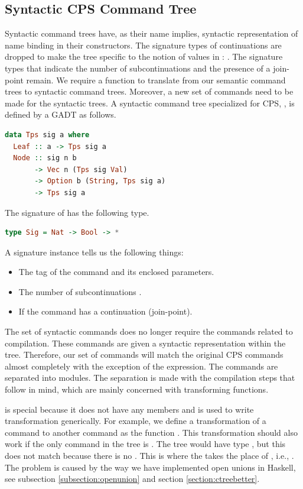 \subsection{\label{subsection:syntree}Syntactic CPS Command Tree}
Syntactic command trees have, as their name implies, syntactic representation of name binding in their constructors. The signature types of continuations are dropped to make the tree specific to the notion of values in : . The signature types that indicate the number of subcontinuations and the presence of a join-point remain. We require a function to translate from our semantic command trees to syntactic command trees. Moreover, a new set of commands need to be made for the syntactic trees. A syntactic command tree specialized for CPS, , is defined by a GADT as follows.

\begin{lstlisting}[language=Haskell]
data Tps sig a where
  Leaf :: a -> Tps sig a
  Node :: sig n b
       -> Vec n (Tps sig Val)
       -> Option b (String, Tps sig a)
       -> Tps sig a
\end{lstlisting}

The signature of  has the following type.

\begin{lstlisting}[language=Haskell]
type Sig = Nat -> Bool -> *
\end{lstlisting}

A signature instance  tells us the following things:

\begin{itemize}
\item The tag of the command and its enclosed parameters.
\item The number of subcontinuations .
\item If the command has a continuation (join-point).
\end{itemize}

The set of syntactic commands does no longer require the commands related to compilation. These commands are given a syntactic representation within the tree. Therefore, our set of commands will match the original CPS commands almost completely with the exception of the  expression. The commands are separated into modules. The separation is made with the compilation steps that follow in mind, which are mainly concerned with transforming functions. 

 is special because it does not have any members and is used to write transformation generically. For example, we define a transformation of a command to another command as the function . This transformation should also work if the only command in the tree is . The tree would have type , but this does not match because there is no . This is where the  takes the place of , i.e., . The  problem is caused by the way we have implemented open unions in Haskell, see subsection \ref{subsection:openunion} and section \ref{section:ctreebetter}.

